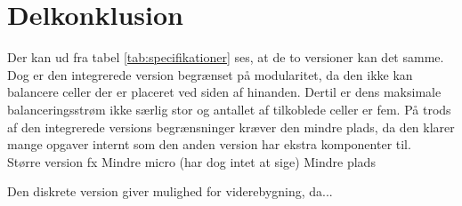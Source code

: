 \section{Delkonklusion}
Der kan ud fra tabel \ref{tab:specifikationer} ses, at de to versioner kan det samme. Dog er den integrerede version begrænset på modularitet, da den ikke kan balancere celler der er placeret ved siden af hinanden. Dertil er dens maksimale balanceringsstrøm ikke særlig stor og antallet af tilkoblede celler er fem. På trods af den integrerede versions begrænsninger kræver den mindre plads, da den klarer mange opgaver internt som den anden version har ekstra komponenter til.
\\

Større version fx
Mindre micro (har dog intet at sige)
Mindre plads



Den diskrete version giver mulighed for viderebygning, da...